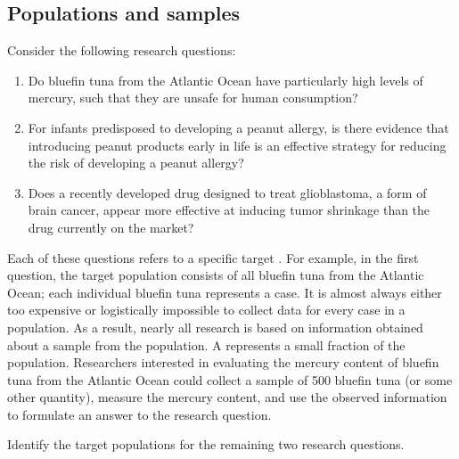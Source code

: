 \subsection{Populations and samples}
\label{populationsAndSamples}

\textD{\noindent}%
Consider the following research questions:

\begin{enumerate}
\setlength{\itemsep}{0mm}

\item Do bluefin tuna from the Atlantic Ocean have particularly high levels of mercury, such that they are unsafe for human consumption?

\item For infants predisposed to developing a peanut allergy, is there evidence that introducing peanut products early in life is an effective strategy for reducing the risk of developing a peanut allergy?

\item Does a recently developed drug designed to treat glioblastoma, a form of brain cancer, appear more effective at inducing tumor shrinkage than the drug currently on the market?
\end{enumerate}

Each of these questions refers to a specific target . For example, in the first question, the target population consists of all bluefin tuna from the Atlantic Ocean; each individual bluefin tuna represents a case. It is almost always either too expensive or logistically impossible to collect data for every case in a population. As a result, nearly all research is based on information obtained about a sample from the population. A  represents a small fraction of the population. Researchers interested in evaluating the mercury content of bluefin tuna from the Atlantic Ocean could collect a sample of 500 bluefin tuna (or some other quantity), measure the mercury content, and use the observed information to formulate an answer to the research question. 

\begin{exercisewrap}
\begin{nexercise}
Identify the target populations for the remaining two research questions.\footnotemark{}
\end{nexercise}
\end{exercisewrap}


